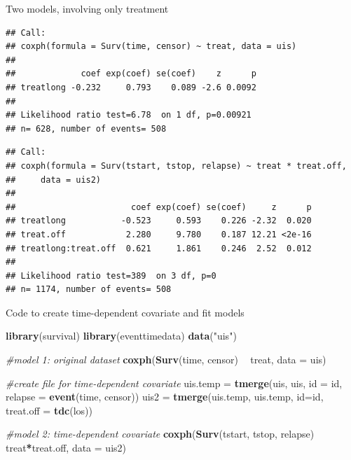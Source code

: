 \documentclass[ignorenonframetext,]{beamer}
\newenvironment{Shaded}{\begin{snugshade}}{\end{snugshade}}
\newcommand{\CommentTok}[1]{\textcolor[rgb]{0.56,0.35,0.01}{\textit{#1}}}
\newcommand{\DataTypeTok}[1]{\textcolor[rgb]{0.13,0.29,0.53}{#1}}
\newcommand{\KeywordTok}[1]{\textcolor[rgb]{0.13,0.29,0.53}{\textbf{#1}}}
\newcommand{\NormalTok}[1]{#1}
\newcommand{\OperatorTok}[1]{\textcolor[rgb]{0.81,0.36,0.00}{\textbf{#1}}}
\newcommand{\StringTok}[1]{\textcolor[rgb]{0.31,0.60,0.02}{#1}}
\begin{document}
\begin{frame}[fragile]{%
\protect\hypertarget{two-models-involving-only-treatment}{%
Two models, involving only treatment}}

\scriptsize

\begin{verbatim}
## Call:
## coxph(formula = Surv(time, censor) ~ treat, data = uis)
## 
##             coef exp(coef) se(coef)    z      p
## treatlong -0.232     0.793    0.089 -2.6 0.0092
## 
## Likelihood ratio test=6.78  on 1 df, p=0.00921
## n= 628, number of events= 508
\end{verbatim}

\vspace{0.5cm}

\begin{verbatim}
## Call:
## coxph(formula = Surv(tstart, tstop, relapse) ~ treat * treat.off, 
##     data = uis2)
## 
##                       coef exp(coef) se(coef)     z      p
## treatlong           -0.523     0.593    0.226 -2.32  0.020
## treat.off            2.280     9.780    0.187 12.21 <2e-16
## treatlong:treat.off  0.621     1.861    0.246  2.52  0.012
## 
## Likelihood ratio test=389  on 3 df, p=0
## n= 1174, number of events= 508
\end{verbatim}

\end{frame}

\begin{frame}[fragile]{%
\protect\hypertarget{code-to-create-time-dependent-covariate-and-fit-models}{%
Code to create time-dependent covariate and fit models}}

\footnotesize

\begin{Shaded}
\begin{Highlighting}[]
\KeywordTok{library}\NormalTok{(survival)}
\KeywordTok{library}\NormalTok{(eventtimedata)}
\KeywordTok{data}\NormalTok{(}\StringTok{"uis"}\NormalTok{)}

\CommentTok{#model 1: original dataset}
\KeywordTok{coxph}\NormalTok{(}\KeywordTok{Surv}\NormalTok{(time, censor) }\OperatorTok{~}\StringTok{ }\NormalTok{treat, }\DataTypeTok{data =}\NormalTok{ uis)}

\CommentTok{#create file for time-dependent covariate}
\NormalTok{uis.temp =}\StringTok{ }\KeywordTok{tmerge}\NormalTok{(uis, uis, }\DataTypeTok{id =}\NormalTok{ id, }\DataTypeTok{relapse =} \KeywordTok{event}\NormalTok{(time, censor))}
\NormalTok{uis2 =}\StringTok{ }\KeywordTok{tmerge}\NormalTok{(uis.temp, uis.temp, }\DataTypeTok{id=}\NormalTok{id, }\DataTypeTok{treat.off =} \KeywordTok{tdc}\NormalTok{(los))}

\CommentTok{#model 2: time-dependent covariate}
\KeywordTok{coxph}\NormalTok{(}\KeywordTok{Surv}\NormalTok{(tstart, tstop, relapse) }\OperatorTok{~}\StringTok{ }\NormalTok{treat}\OperatorTok{*}\NormalTok{treat.off, }\DataTypeTok{data =}\NormalTok{ uis2)}
\end{Highlighting}
\end{Shaded}

\end{frame}
\end{document}
